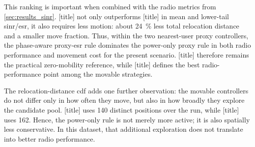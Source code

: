 This ranking is important when combined with the radio metrics from \cref{sec:results_sinr}. [title] not only outperforms [title] in mean and lower-tail \gls{sinr}/\gls{esr}, it also requires less motion: about \SI{24}{\percent} less total relocation distance and a smaller move fraction. Thus, within the two nearest-user proxy controllers, the phase-aware proxy-\gls{esr} rule dominates the power-only proxy rule in both radio performance and movement cost for the present scenario. [title] therefore remains the practical zero-mobility reference, while [title] defines the best radio-performance point among the movable strategies.

The relocation-distance \gls{cdf} adds one further observation: the movable controllers do not differ only in how often they move, but also in how broadly they explore the candidate pool. [title] uses \num{140} distinct positions over the run, while [title] uses \num{162}. Hence, the power-only rule is not merely more active; it is also spatially less conservative. In this dataset, that additional exploration does not translate into better radio performance.
